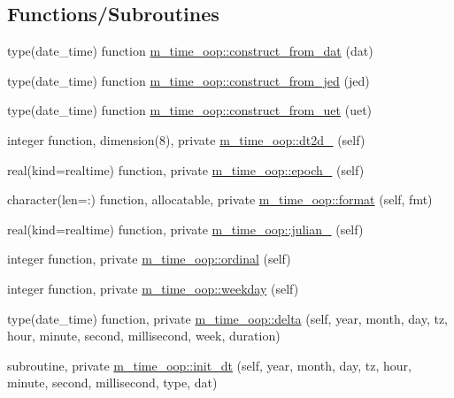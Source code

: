 \subsection*{Functions/\+Subroutines}
\begin{DoxyCompactItemize}
\item 
type(date\+\_\+time) function \mbox{\hyperlink{namespacem__time__oop_ae43c4146d74863b5aee027ebc0103f48}{m\+\_\+time\+\_\+oop\+::construct\+\_\+from\+\_\+dat}} (dat)
\item 
type(date\+\_\+time) function \mbox{\hyperlink{namespacem__time__oop_ac7d9aa1885c2b8df613541be8a147064}{m\+\_\+time\+\_\+oop\+::construct\+\_\+from\+\_\+jed}} (jed)
\item 
type(date\+\_\+time) function \mbox{\hyperlink{namespacem__time__oop_ae952d7599526f1b2632452d00363add3}{m\+\_\+time\+\_\+oop\+::construct\+\_\+from\+\_\+uet}} (uet)
\item 
integer function, dimension(8), private \mbox{\hyperlink{namespacem__time__oop_a93bafde872994fe68136d83195400e11}{m\+\_\+time\+\_\+oop\+::dt2d\+\_\+}} (self)
\item 
real(kind=realtime) function, private \mbox{\hyperlink{namespacem__time__oop_ab4cc90bb587c2d3c2819bffc8f92cb59}{m\+\_\+time\+\_\+oop\+::epoch\+\_\+}} (self)
\item 
character(len=\+:) function, allocatable, private \mbox{\hyperlink{namespacem__time__oop_a78bb598e3481faa48df9733a3f9ae060}{m\+\_\+time\+\_\+oop\+::format}} (self, fmt)
\item 
real(kind=realtime) function, private \mbox{\hyperlink{namespacem__time__oop_a85c4d4edaa644bf22f68ffd724de036a}{m\+\_\+time\+\_\+oop\+::julian\+\_\+}} (self)
\item 
integer function, private \mbox{\hyperlink{namespacem__time__oop_a7845f6da505dff53007df45b5c198081}{m\+\_\+time\+\_\+oop\+::ordinal}} (self)
\item 
integer function, private \mbox{\hyperlink{namespacem__time__oop_ad290beea1dd0dc3d34486e8b4cd8a86c}{m\+\_\+time\+\_\+oop\+::weekday}} (self)
\item 
type(date\+\_\+time) function, private \mbox{\hyperlink{namespacem__time__oop_aecd1edc1f6ca447d5381c8092eba7924}{m\+\_\+time\+\_\+oop\+::delta}} (self, year, month, day, tz, hour, minute, second, millisecond, week, duration)
\item 
subroutine, private \mbox{\hyperlink{namespacem__time__oop_ac81ff1eb27f637a60530d3c5d442fc71}{m\+\_\+time\+\_\+oop\+::init\+\_\+dt}} (self, year, month, day, tz, hour, minute, second, millisecond, type, dat)

\end{DoxyCompactItemize}
